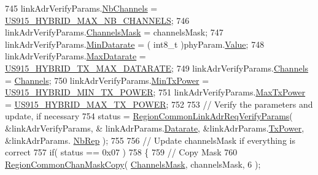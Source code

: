 \begin{DoxyCode}
745     linkAdrVerifyParams.\mbox{\hyperlink{structs_region_common_link_adr_req_verify_params_a3c6d7fa8dd5ecfd55568426ded700142}{NbChannels}} = \mbox{\hyperlink{group___r_e_g_i_o_n_u_s915_h_y_b_ga977b73cbf7a5d15e2bf543fad5f35710}{US915\_HYBRID\_MAX\_NB\_CHANNELS}};
746     linkAdrVerifyParams.\mbox{\hyperlink{structs_region_common_link_adr_req_verify_params_aed7477cfc6166e3ee0499b898443426a}{ChannelsMask}} = channelsMask;
747     linkAdrVerifyParams.\mbox{\hyperlink{structs_region_common_link_adr_req_verify_params_a990b009904bde32da9c6f4cd39a27e4c}{MinDatarate}} = ( int8\_t )phyParam.\mbox{\hyperlink{unionu_phy_param_a8e0dcce3428a8051614e852b8836d0d1}{Value}};
748     linkAdrVerifyParams.\mbox{\hyperlink{structs_region_common_link_adr_req_verify_params_af426381985228a55dc22b90441f49c4c}{MaxDatarate}} = \mbox{\hyperlink{group___r_e_g_i_o_n_u_s915_h_y_b_ga41872f6bb20d1dca0b778205ada36348}{US915\_HYBRID\_TX\_MAX\_DATARATE}};
749     linkAdrVerifyParams.\mbox{\hyperlink{structs_region_common_link_adr_req_verify_params_afecbd1e457cbd79eb7072bd140ff33d4}{Channels}} = \mbox{\hyperlink{_region_u_s915-_hybrid_8c_a2781ea69a73fdddcc54719ec4775751f}{Channels}};
750     linkAdrVerifyParams.\mbox{\hyperlink{structs_region_common_link_adr_req_verify_params_afe7bf10e9fadd8be6beb31e8b91a1ba2}{MinTxPower}} = \mbox{\hyperlink{group___r_e_g_i_o_n_u_s915_h_y_b_ga0aece8c836bf5bf19a28589cb3cda70e}{US915\_HYBRID\_MIN\_TX\_POWER}};
751     linkAdrVerifyParams.\mbox{\hyperlink{structs_region_common_link_adr_req_verify_params_a118829b26fb7d913d4202d5d06356a95}{MaxTxPower}} = \mbox{\hyperlink{group___r_e_g_i_o_n_u_s915_h_y_b_ga94a1ed1e5cca1f05f0ac4916e164f529}{US915\_HYBRID\_MAX\_TX\_POWER}};
752 
753     \textcolor{comment}{// Verify the parameters and update, if necessary}
754     status = \mbox{\hyperlink{group___r_e_g_i_o_n_c_o_m_m_o_n_ga2c87f98f09793dc7fa63a9801feeed73}{RegionCommonLinkAdrReqVerifyParams}}( &linkAdrVerifyParams, &
      linkAdrParams.\mbox{\hyperlink{structs_region_common_link_adr_params_ae2f6080f3aa0e9485c55513ca56bb24d}{Datarate}}, &linkAdrParams.\mbox{\hyperlink{structs_region_common_link_adr_params_a037b4f849fa8ed4aa1d3c58aef2b28ec}{TxPower}}, &linkAdrParams.
      \mbox{\hyperlink{structs_region_common_link_adr_params_a3b99538671d86dbfe2f6754ce6f9577a}{NbRep}} );
755 
756     \textcolor{comment}{// Update channelsMask if everything is correct}
757     \textcolor{keywordflow}{if}( status == 0x07 )
758     \{
759         \textcolor{comment}{// Copy Mask}
760         \mbox{\hyperlink{group___r_e_g_i_o_n_c_o_m_m_o_n_ga95f5199d490113269fae7f2e0569e9a0}{RegionCommonChanMaskCopy}}( \mbox{\hyperlink{_region_u_s915-_hybrid_8c_a2188957b5ca6af8092154d7ccbfa5757}{ChannelsMask}}, channelsMask, 6 );

\end{DoxyCode}
